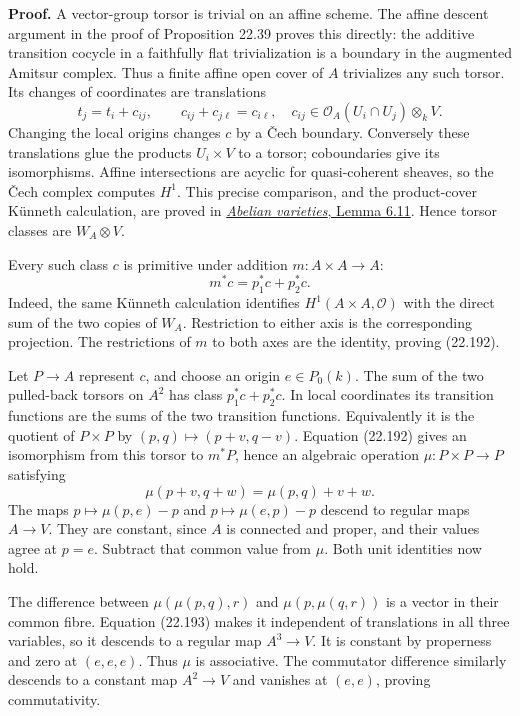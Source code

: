 \documentclass[
  11pt,
  a4paper,
]{article}
\begin{document}
\textbf{Proof.} A vector-group torsor is trivial on an affine scheme.
The affine descent argument in the proof of Proposition 22.39 proves
this directly: the additive transition cocycle in a faithfully flat
trivialization is a boundary in the augmented Amitsur complex. Thus a
finite affine open cover of \(A\) trivializes any such torsor. Its
changes of coordinates are translations \[
 t_j=t_i+c_{ij},\qquad
 c_{ij}+c_{j\ell}=c_{i\ell},
 \quad c_{ij}\in\mathcal O_A(U_i\cap U_j)\otimes_kV.
 \tag{22.191}
\] Changing the local origins changes \(c\) by a Čech boundary.
Conversely these translations glue the products \(U_i\times V\) to a
torsor; coboundaries give its isomorphisms. Affine intersections are
acyclic for quasi-coherent sheaves, so the Čech complex computes
\(H^1\). This precise comparison, and the product-cover Künneth
calculation, are proved in
\href{https://github.com/KokunoYumeto/open-math-courses-public/blob/146dc81802e69cf262fb6cc65c1b9f74e71f4625/docs/courses/AG-GS/src/abelian-varieties.md\#611-the-picard-scheme-and-the-dual-variety}{\emph{Abelian
varieties}, Lemma 6.11}. Hence torsor classes are \(W_A\otimes V\).

Every such class \(c\) is primitive under addition \(m:A\times A\to A\):
\[
 m^*c=p_1^*c+p_2^*c.
 \tag{22.192}
\] Indeed, the same Künneth calculation identifies
\(H^1(A\times A,\mathcal O)\) with the direct sum of the two copies of
\(W_A\). Restriction to either axis is the corresponding projection. The
restrictions of \(m\) to both axes are the identity, proving (22.192).

Let \(P\to A\) represent \(c\), and choose an origin \(e\in P_0(k)\).
The sum of the two pulled-back torsors on \(A^2\) has class
\(p_1^*c+p_2^*c\). In local coordinates its transition functions are the
sums of the two transition functions. Equivalently it is the quotient of
\(P\times P\) by \((p,q)\mapsto(p+v,q-v)\). Equation (22.192) gives an
isomorphism from this torsor to \(m^*P\), hence an algebraic operation
\(\mu:P\times P\to P\) satisfying \[
 \mu(p+v,q+w)=\mu(p,q)+v+w.
 \tag{22.193}
\] The maps \(p\mapsto\mu(p,e)-p\) and \(p\mapsto\mu(e,p)-p\) descend to
regular maps \(A\to V\). They are constant, since \(A\) is connected and
proper, and their values agree at \(p=e\). Subtract that common value
from \(\mu\). Both unit identities now hold.

The difference between \(\mu(\mu(p,q),r)\) and \(\mu(p,\mu(q,r))\) is a
vector in their common fibre. Equation (22.193) makes it independent of
translations in all three variables, so it descends to a regular map
\(A^3\to V\). It is constant by properness and zero at \((e,e,e)\). Thus
\(\mu\) is associative. The commutator difference similarly descends to
a constant map \(A^2\to V\) and vanishes at \((e,e)\), proving
commutativity.
\end{document}
